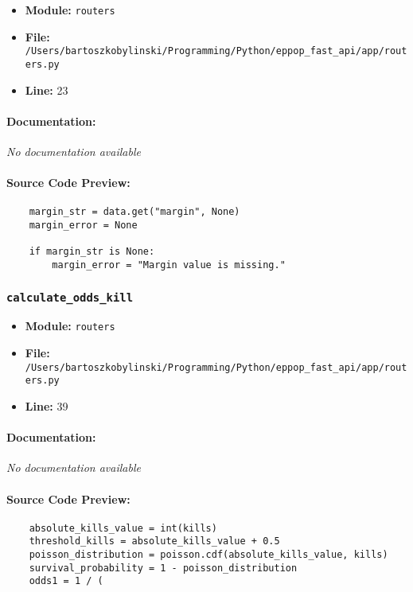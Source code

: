 \documentclass[11pt,a4paper]{article}
\begin{document}
\begin{itemize}
    \item \textbf{Module:} \texttt{routers}
    \item \textbf{File:} \texttt{/Users/bartoszkobylinski/Programming/Python/eppop\_fast\_api/app/routers.py}
    \item \textbf{Line:} 23
\end{itemize}

\paragraph{Documentation:} \textit{No documentation available}

\paragraph{Source Code Preview:}
\begin{verbatim}
    margin_str = data.get("margin", None)
    margin_error = None

    if margin_str is None:
        margin_error = "Margin value is missing."
\end{verbatim}

\vspace{1em}
\subsubsection{\texttt{calculate\_odds\_kill}}

\begin{itemize}
    \item \textbf{Module:} \texttt{routers}
    \item \textbf{File:} \texttt{/Users/bartoszkobylinski/Programming/Python/eppop\_fast\_api/app/routers.py}
    \item \textbf{Line:} 39
\end{itemize}

\paragraph{Documentation:} \textit{No documentation available}

\paragraph{Source Code Preview:}
\begin{verbatim}
    absolute_kills_value = int(kills)
    threshold_kills = absolute_kills_value + 0.5
    poisson_distribution = poisson.cdf(absolute_kills_value, kills)
    survival_probability = 1 - poisson_distribution
    odds1 = 1 / (
\end{verbatim}
\end{document}
